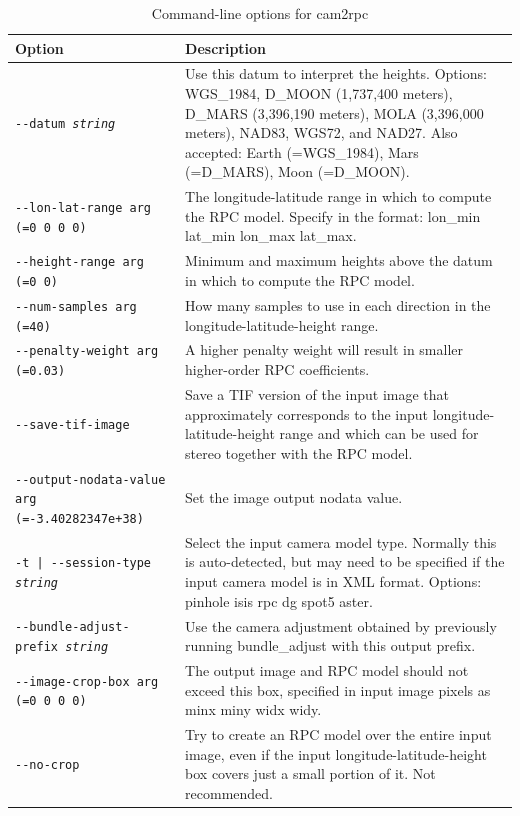 \begin{longtable}{|l|p{7.0cm}|}
\caption{Command-line options for cam2rpc}
\label{tbl:cam2rpc}
\endfirsthead
\endhead
\endfoot
\endlastfoot
\hline
Option & Description \\ \hline \hline
\texttt{-\/-datum \textit{string}} & Use this datum to interpret the heights. Options: WGS\_1984, D\_MOON (1,737,400 meters), D\_MARS (3,396,190 meters), MOLA (3,396,000 meters), NAD83, WGS72, and NAD27. Also accepted: Earth (=WGS\_1984), Mars (=D\_MARS), Moon (=D\_MOON).\\ \hline
\texttt{-\/-lon-lat-range arg (=0 0 0 0)} & The longitude-latitude range in which to compute the RPC model. Specify in the format: lon\_min lat\_min lon\_max lat\_max.\\ \hline
\texttt{-\/-height-range arg (=0 0)} & Minimum and maximum heights above the datum in which to compute the RPC model.\\ \hline
\texttt{-\/-num-samples arg (=40)} & How many samples to use in each direction in the longitude-latitude-height range.\\ \hline
\texttt{-\/-penalty-weight arg (=0.03)} & A higher penalty weight will result in smaller higher-order RPC coefficients.\\ \hline
\texttt{-\/-save-tif-image} & Save a TIF version of the input image that approximately corresponds to the input longitude-latitude-height range and which can be used for stereo together with the RPC model.\\ \hline
\texttt{-\/-output-nodata-value arg (=-3.40282347e+38)} & Set the image output nodata value.\\ \hline
\texttt{-t | -\/-session-type  \textit{string}} & Select the input camera model type. Normally this is auto-detected, but may need to be specified if the input camera model is in XML format. Options: pinhole isis rpc dg spot5 aster.\\ \hline
\texttt{-\/-bundle-adjust-prefix \textit{string}} & Use the camera
adjustment obtained by previously running bundle\_adjust with this
output prefix. \\ \hline
\texttt{-\/-image-crop-box arg (=0 0 0 0)} & The output image and RPC model should not exceed this box, specified in input image pixels as minx miny widx widy.\\ \hline
\texttt{-\/-no-crop} & Try to create an RPC model over the entire input image, even if the input longitude-latitude-height box covers just a small portion of it. Not recommended.\\ \hline

\end{longtable}

